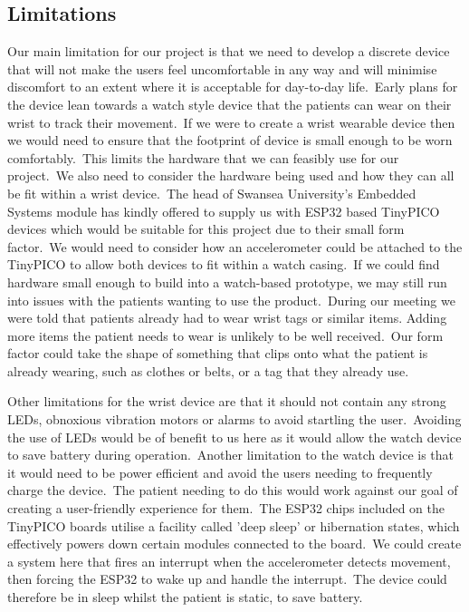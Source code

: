         \subsection{Limitations}
            Our main limitation for our project is that we need to develop a discrete device that will not make the
            users feel uncomfortable in any way and will minimise discomfort to an extent where it is
            acceptable for day-to-day life.\ Early plans for the device lean towards a watch style device that the
            patients can wear on their wrist to track their movement.\ If we were to create a wrist wearable device
            then we would need to ensure that the footprint of device is small enough to be worn comfortably.\ This limits
            the hardware that we can feasibly use for our project.\ We also need to consider the hardware being
            used and how they can all be fit within a wrist device.\ The head of Swansea University’s Embedded Systems
            module has kindly offered to supply us with ESP32 based TinyPICO devices which would be suitable for this
            project due to their small form factor.\ We would need to consider how an accelerometer could be attached to
            the TinyPICO to allow both devices to fit within a watch casing.\ If we could find hardware small
            enough to build into a watch-based prototype, we may still run into issues with the patients wanting to use
            the product.\ During our meeting we were told that patients already had to wear wrist tags or similar items.
            Adding more items the patient needs to wear is unlikely to be well received.\ Our form factor could take the
            shape of something that clips onto what the patient is already wearing, such as clothes or belts, or a tag
            that they already use.

            Other limitations for the wrist device are that it should not contain any strong LEDs, obnoxious vibration
            motors or alarms to avoid startling the user.\ Avoiding the use of LEDs would be of benefit to us here as it
            would allow the watch device to save battery during operation.\ Another limitation to the watch device is
            that it would need to be power efficient and avoid the users needing to frequently charge the device.\ The
            patient needing to do this would work against our goal of creating a user-friendly experience for them.\ The
            ESP32 chips included on the TinyPICO boards utilise a facility called 'deep sleep' or hibernation states,
            which effectively powers down certain modules connected to the board.\ We could create a system here that
            fires an interrupt when the accelerometer detects movement, then forcing the ESP32 to wake up and handle the
            interrupt.\ The device could therefore be in sleep whilst the patient is static, to save battery.

